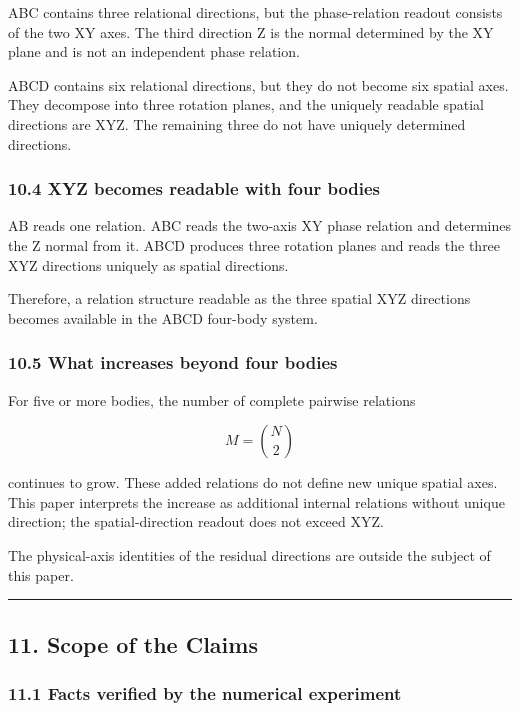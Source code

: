 \documentclass[
  10pt,
  a4paper,
]{article}
\begin{document}
ABC contains three relational directions, but the phase-relation readout
consists of the two XY axes. The third direction Z is the normal
determined by the XY plane and is not an independent phase relation.

ABCD contains six relational directions, but they do not become six
spatial axes. They decompose into three rotation planes, and the
uniquely readable spatial directions are XYZ. The remaining three do not
have uniquely determined directions.

\subsubsection{10.4 XYZ becomes readable with four
bodies}\label{xyz-becomes-readable-with-four-bodies}

AB reads one relation. ABC reads the two-axis XY phase relation and
determines the Z normal from it. ABCD produces three rotation planes and
reads the three XYZ directions uniquely as spatial directions.

Therefore, a relation structure readable as the three spatial XYZ
directions becomes available in the ABCD four-body system.

\subsubsection{10.5 What increases beyond four
bodies}\label{what-increases-beyond-four-bodies}

For five or more bodies, the number of complete pairwise relations

\[
M=\binom{N}{2}
\]

continues to grow. These added relations do not define new unique
spatial axes. This paper interprets the increase as additional internal
relations without unique direction; the spatial-direction readout does
not exceed XYZ.

The physical-axis identities of the residual directions are outside the
subject of this paper.

\begin{center}\rule{0.5\linewidth}{0.5pt}\end{center}

\subsection{11. Scope of the Claims}\label{scope-of-the-claims}

\subsubsection{11.1 Facts verified by the numerical
experiment}\label{facts-verified-by-the-numerical-experiment}
\end{document}
